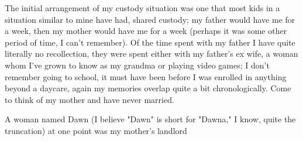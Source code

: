 \documentclass[12pt]{article}
\begin{document}
The initial arrangement of my custody situation was one that most kids in a situation similar to mine
    have had, shared custody; my father would have me for a week, then my mother would have me for a week
    (perhaps it was some other period of time, I can't remember).
Of the time spent with my father I have quite literally no recollection, they were
    spent either with my father's ex wife, a woman whom I've grown to know as my grandma or playing video
    games; I don't remember going to school, it must have been before I was enrolled in anything beyond a
    daycare, again my memories overlap quite a bit chronologically.
Come to think of my  mother and have never married.

A woman named Dawn (I believe "Dawn" is short for "Dawna," I know, quite the truncation) at one point was
    my mother's landlord
\end{document}
